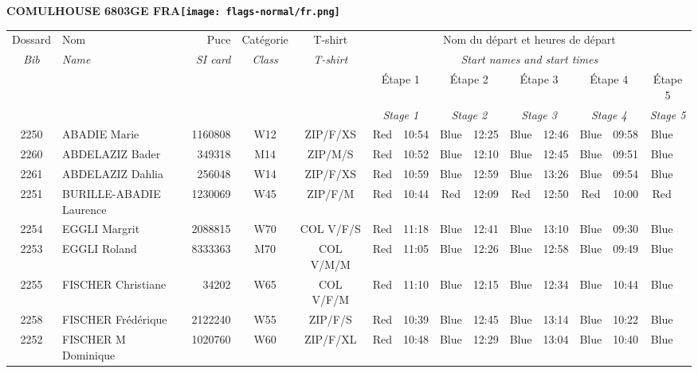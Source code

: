 \documentclass{report}
\begin{document}
\newpage
  \Huge \centering \bfseries COMULHOUSE 6803GE FRA\normalfont \footnotesize \sffamily \hfill \texttt{[image: flags-normal/fr.png]} \newline 
  \begin{longtable}{|c|l|r|c|c|*{5}{cc|}}
    Dossard & Nom  & Puce    & Catégorie & T-shirt & \multicolumn{10}{c|}{Nom du départ et heures de départ} \\
    \itshape Bib     & \itshape Name & \itshape SI card & \itshape Class  & \itshape  T-shirt  & \multicolumn{10}{c|}{\itshape Start names and start times} \\
    \hline
    & & & & & \multicolumn{2}{c|}{Étape 1} & \multicolumn{2}{c|}{Étape 2} & \multicolumn{2}{c|}{Étape 3} & \multicolumn{2}{c|}{Étape 4} & \multicolumn{2}{c|}{Étape 5} \\
    & & & & & \multicolumn{2}{c|}{\itshape Stage 1} & \multicolumn{2}{c|}{\itshape Stage 2} & \multicolumn{2}{c|}{\itshape Stage 3} & \multicolumn{2}{c|}{\itshape Stage 4} & \multicolumn{2}{c|}{\itshape Stage 5} \\
    \hline
    2250 & ABADIE Marie & 1160808 & W12 & ZIP/F/XS & Red & 10:54 & Blue & 12:25 & Blue & 12:46 & Blue & 09:58 & Blue &  \\
    2260 & ABDELAZIZ Bader & 349318 & M14 & ZIP/M/S & Red & 10:52 & Blue & 12:10 & Blue & 12:45 & Blue & 09:51 & Blue &  \\
    2261 & ABDELAZIZ Dahlia & 256048 & W14 & ZIP/F/XS & Red & 10:59 & Blue & 12:59 & Blue & 13:26 & Blue & 09:54 & Blue &  \\
    2251 & BURILLE-ABADIE Laurence & 1230069 & W45 & ZIP/F/M & Red & 10:44 & Red & 12:09 & Red & 12:50 & Red & 10:00 & Red &  \\
    2254 & EGGLI Margrit & 2088815 & W70 & COL V/F/S & Red & 11:18 & Blue & 12:41 & Blue & 13:10 & Blue & 09:30 & Blue &  \\
    2253 & EGGLI Roland & 8333363 & M70 & COL V/M/M & Red & 11:05 & Blue & 12:26 & Blue & 12:58 & Blue & 09:49 & Blue &  \\
    2255 & FISCHER Christiane & 34202 & W65 & COL V/F/M & Red & 11:10 & Blue & 12:15 & Blue & 12:34 & Blue & 10:44 & Blue &  \\
    2258 & FISCHER Frédérique & 2122240 & W55 & ZIP/F/S & Red & 10:39 & Blue & 12:45 & Blue & 13:14 & Blue & 10:22 & Blue &  \\
    2252 & FISCHER M Dominique & 1020760 & W60 & ZIP/F/XL & Red & 10:48 & Blue & 12:29 & Blue & 13:04 & Blue & 10:40 & Blue &  \\

\end{longtable}
\end{document}
